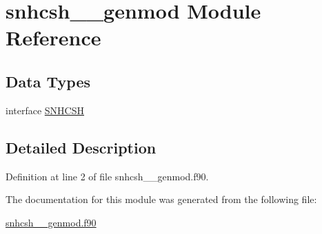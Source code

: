 \hypertarget{classsnhcsh____genmod}{\section{snhcsh\+\_\+\+\_\+genmod Module Reference}
\label{classsnhcsh____genmod}
}
\subsection*{Data Types}
\begin{DoxyCompactItemize}
\item 
interface \hyperlink{interfacesnhcsh____genmod_1_1SNHCSH}{S\+N\+H\+C\+S\+H}
\end{DoxyCompactItemize}


\subsection{Detailed Description}


Definition at line 2 of file snhcsh\+\_\+\+\_\+genmod.\+f90.



The documentation for this module was generated from the following file\+:\begin{DoxyCompactItemize}
\item 
\hyperlink{snhcsh____genmod_8f90}{snhcsh\+\_\+\+\_\+genmod.\+f90}\end{DoxyCompactItemize}
